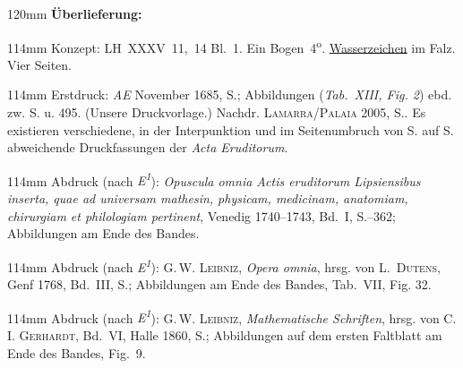 \begin{ledgroupsized}[r]{120mm}
\footnotesize
\pstart
\noindent\textbf{Überlieferung:}
\pend
\end{ledgroupsized}
\begin{ledgroupsized}[r]{114mm}
\footnotesize
\pstart \parindent -6mm
%
Konzept:
LH~XXXV~11,~14 Bl.~1.
Ein Bogen~4\textsuperscript{o}.
\href{\Scan{LH_35_11_14_001-002wz}}%
{Wasserzeichen}
im Falz.
Vier Seiten.
\pend
\end{ledgroupsized}
\begin{ledgroupsized}[r]{114mm}
\footnotesize
\pstart
\parindent -6mm
%
Erstdruck: \cite{01023}\textit{AE} November 1685, S.;
Abbildungen (\textit{Tab.~XIII, Fig. 2}) ebd. zw. S. u. 495.
(Unsere Druckvorlage.)
Nachdr. \textsc{Lamarra/Palaia} 2005, S..\cite{01289}
Es existieren verschiedene, in der Interpunktion und im Seitenumbruch von S. auf S. abweichende Druckfassungen der \textit{Acta Eruditorum}.
\pend%
\end{ledgroupsized}
\begin{ledgroupsized}[r]{114mm}
\footnotesize 
\pstart \parindent -6mm
%
Abdruck (nach \textit{E\textsuperscript{1}}): 
\cite{01421}\textit{Opuscula omnia Actis eruditorum Lipsiensibus inserta, quae ad universam mathesin, physicam, medicinam, anatomiam, chirurgiam et philologiam pertinent}, Venedig 1740--1743,  Bd.~I, S.--362; Abbildungen am Ende des Bandes.
\pend
\end{ledgroupsized}
\begin{ledgroupsized}[r]{114mm}
\footnotesize 
\pstart \parindent -6mm
%
Abdruck (nach \textit{E\textsuperscript{1}}): 
G.\,W. \textsc{Leibniz}, \textit{Opera omnia}, hrsg. von L.~\textsc{Dutens}, 
Genf 1768, Bd.~III, %
S.; 
Abbildungen am Ende des Bandes, Tab.~VII, Fig. 32.\cite{00150}
\pend
\end{ledgroupsized}
\begin{ledgroupsized}[r]{114mm}
\footnotesize 
\pstart \parindent -6mm
%
Abdruck (nach \textit{E\textsuperscript{1}}): 
G.\,W. \textsc{Leibniz}, \textit{Mathematische Schriften}, hrsg. von C.\,I. \textsc{Gerhardt}, 
Bd.~VI, Halle 1860, S.; 
Abbildungen auf dem ersten Faltblatt am Ende des Bandes, Fig.~9.\cite{01043}
\pend
\end{ledgroupsized}

